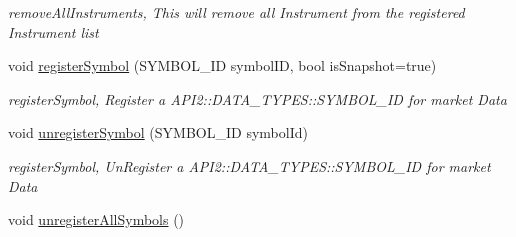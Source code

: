 \begin{DoxyCompactItemize}
\begin{DoxyCompactList}\small\item\em remove\-All\-Instruments, This will remove all Instrument from the registered Instrument list \end{DoxyCompactList}\item 
void \hyperlink{class_a_p_i2_1_1_s_g_context_a5fc0688752b90e7366524b83d3a70c93}{register\-Symbol} (S\-Y\-M\-B\-O\-L\-\_\-\-I\-D symbol\-I\-D, bool is\-Snapshot=true)
\begin{DoxyCompactList}\small\item\em register\-Symbol, Register a A\-P\-I2\-::\-D\-A\-T\-A\-\_\-\-T\-Y\-P\-E\-S\-::\-S\-Y\-M\-B\-O\-L\-\_\-\-I\-D for market Data \end{DoxyCompactList}\item 
void \hyperlink{class_a_p_i2_1_1_s_g_context_a082c5a756706517153acf2e4a635ae25}{unregister\-Symbol} (S\-Y\-M\-B\-O\-L\-\_\-\-I\-D symbol\-Id)
\begin{DoxyCompactList}\small\item\em register\-Symbol, Un\-Register a A\-P\-I2\-::\-D\-A\-T\-A\-\_\-\-T\-Y\-P\-E\-S\-::\-S\-Y\-M\-B\-O\-L\-\_\-\-I\-D for market Data \end{DoxyCompactList}\item 
\hypertarget{class_a_p_i2_1_1_s_g_context_a1af0e0e9693eb410378d1e29947ca35d}{void \hyperlink{class_a_p_i2_1_1_s_g_context_a1af0e0e9693eb410378d1e29947ca35d}{unregister\-All\-Symbols} ()}\label{class_a_p_i2_1_1_s_g_context_a1af0e0e9693eb410378d1e29947ca35d}


\end{DoxyCompactItemize}
